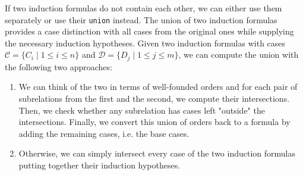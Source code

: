 If two induction formulas do not contain each other, we can either use them separately or use their \texttt{union} instead. The union of two induction formulas provides a case distinction with all cases from the original ones while supplying the necessary induction hypotheses. Given two induction formulas with cases $\mathcal{C}=\{C_i \mid 1\le i\le n\}$ and $\mathcal{D}=\{D_j \mid 1\le j\le m\}$, we can compute the union with the following two approaches:
\begin{enumerate}
	\item We can think of the two in terms of well-founded orders and for each pair of subrelations from the first and the second, we compute their intersections. Then, we check whether any subrelation has cases left "outside" the intersections. Finally, we convert this union of orders back to a formula by adding the remaining cases, i.e. the base cases.
	\item Otherwise, we can simply intersect every case of the two induction formulas putting together their induction hypotheses.
\end{enumerate}
